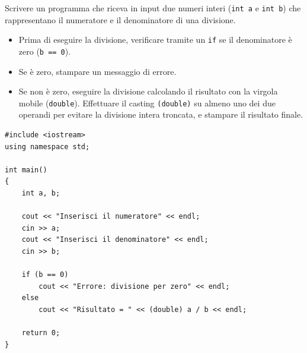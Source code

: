 \documentclass[11pt,fleqn]{book}
\begin{document}
\begin{esercizio}[2]
    Scrivere un programma che riceva in input due numeri interi (\texttt{int a} e \texttt{int b}) che rappresentano il numeratore e il denominatore di una divisione.
    \begin{itemize}
        \item Prima di eseguire la divisione, verificare tramite un \texttt{if} se il denominatore è zero (\texttt{b == 0}).
        \item Se è zero, stampare un messaggio di errore.
        \item Se non è zero, eseguire la divisione calcolando il risultato con la virgola mobile (\texttt{double}). Effettuare il casting \texttt{(double)} su almeno uno dei due operandi per evitare la divisione intera troncata, e stampare il risultato finale.
    \end{itemize}
    \ifsoluzioni
    \solution
    \begin{lstlisting}[style=cpp]
#include <iostream>
using namespace std;

int main()
{
    int a, b;

    cout << "Inserisci il numeratore" << endl;
    cin >> a;
    cout << "Inserisci il denominatore" << endl;
    cin >> b;

    if (b == 0)
        cout << "Errore: divisione per zero" << endl;
    else
        cout << "Risultato = " << (double) a / b << endl;

    return 0;
}
    \end{lstlisting}
    \fi
\end{esercizio}
\end{document}
